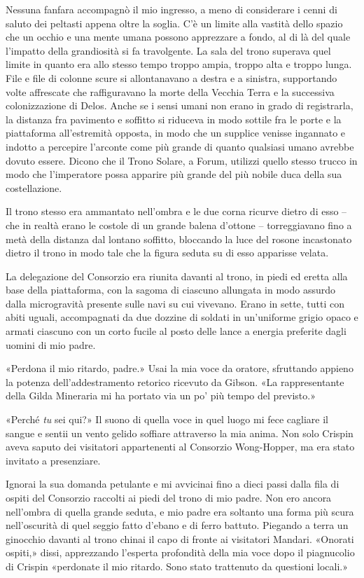 Nessuna fanfara accompagnò il mio ingresso, a meno di {considerare} i
cenni di saluto dei peltasti appena oltre la soglia. C'è un limite alla
vastità dello spazio che un occhio e una mente umana possono apprezzare
a fondo, al di là del quale l'impatto della grandiosità si fa
travolgente. La sala del trono superava quel limite in quanto era allo
stesso tempo troppo ampia, troppo alta e troppo lunga. File e file di
colonne scure si allontanavano a destra e a sinistra, supportando volte
affrescate che raffiguravano la morte della Vecchia Terra e la
successiva colonizzazione di Delos. Anche se i sensi umani non erano in
grado di registrarla, la distanza fra pavimento e soffitto si riduceva
in modo sottile fra le porte e la piattaforma all'estremità opposta, in
modo che un supplice venisse ingannato e indotto a percepire l'arconte
come più grande di quanto qualsiasi umano avrebbe dovuto essere. Dicono
che il Trono Solare, a Forum, utilizzi quello stesso trucco in modo che
l'imperatore possa apparire più grande del più nobile duca della sua
costellazione.

Il trono stesso era ammantato nell'ombra e le due corna ricurve dietro
di esso -- che in realtà erano le costole di un grande balena d'ottone
-- torreggiavano fino a metà della distanza dal lontano soffitto,
bloccando la luce del rosone incastonato dietro il trono in modo tale
che la figura seduta su di esso apparisse velata.

La delegazione del Consorzio era riunita davanti al trono, in piedi ed
eretta alla base della piattaforma, con la sagoma di ciascuno allungata
in modo assurdo dalla microgravità presente sulle navi su cui vivevano.
Erano in sette, tutti con abiti uguali, accompagnati da due dozzine di
soldati in un'uniforme grigio opaco e armati ciascuno con un corto
fucile al posto delle lance a energia preferite dagli uomini di mio
padre.

«Perdona il mio ritardo, padre.» Usai la mia voce da oratore, sfruttando
appieno la potenza dell'addestramento retorico ricevuto da Gibson. «La
rappresentante della Gilda Mineraria mi ha portato via un po' più tempo
del previsto.»

«Perché \emph{tu} sei qui?» Il suono di quella voce in quel luogo mi
fece cagliare il sangue e sentii un vento gelido soffiare attraverso la
mia anima. Non solo Crispin aveva saputo dei visitatori appartenenti al
Consorzio Wong-Hopper, ma era stato invitato a presenziare.

Ignorai la sua domanda petulante e mi avvicinai fino a dieci passi dalla
fila di ospiti del Consorzio raccolti ai piedi del trono di mio padre.
Non ero ancora nell'ombra di quella grande seduta, e mio padre era
soltanto una forma più scura nell'oscurità di quel seggio fatto d'ebano
e di ferro battuto. Piegando a terra un ginocchio davanti al trono
chinai il capo di fronte ai visitatori Mandari. «Onorati ospiti,» dissi,
apprezzando l'esperta profondità della mia voce dopo il piagnucolio di
Crispin «perdonate il mio ritardo. Sono stato trattenuto da questioni
locali.»

